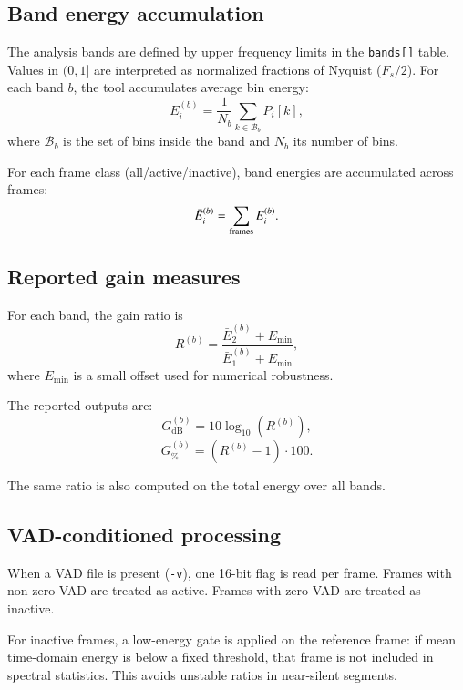 \subsection{Band energy accumulation}

The analysis bands are defined by upper frequency limits in the
\texttt{bands[]} table. Values in $(0,1]$ are interpreted as normalized
fractions of Nyquist ($F_s/2$). For each band $b$, the tool accumulates
average bin energy:
\begin{equation}
E_i^{(b)} = \frac{1}{N_b}\sum_{k \in \mathcal{B}_b} P_i[k],
\end{equation}
where $\mathcal{B}_b$ is the set of bins inside the band and $N_b$ its
number of bins.

For each frame class (all/active/inactive), band energies are accumulated
across frames:
\begin{equation}
\bar{E}_i^{(b)} = \sum_{\mbox{\scriptsize frames}} E_i^{(b)}.
\end{equation}

\subsection{Reported gain measures}

For each band, the gain ratio is
\begin{equation}
R^{(b)} = \frac{\bar{E}_2^{(b)} + E_{\min}}{\bar{E}_1^{(b)} + E_{\min}},
\end{equation}
where $E_{\min}$ is a small offset used for numerical robustness.

The reported outputs are:
\begin{equation}
G_{\mathrm{dB}}^{(b)} = 10\log_{10}\left(R^{(b)}\right),
\end{equation}
\begin{equation}
G_{\%}^{(b)} = \left(R^{(b)} - 1\right)\cdot 100.
\end{equation}

The same ratio is also computed on the total energy over all bands.

\subsection{VAD-conditioned processing}

When a VAD file is present (\texttt{-v}), one 16-bit flag is read per
frame. Frames with non-zero VAD are treated as active. Frames with zero
VAD are treated as inactive.

For inactive frames, a low-energy gate is applied on the reference frame:
if mean time-domain energy is below a fixed threshold, that frame is not
included in spectral statistics. This avoids unstable ratios in near-silent
segments.

